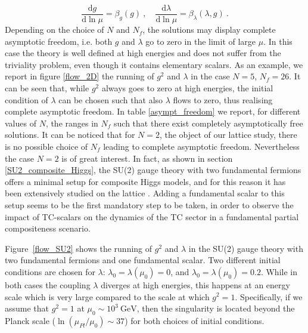 \begin{equation}
\frac{\mathrm d g}{\mathrm d \ln \mu} = \beta_g (g) \: ,  \quad \frac{\mathrm d \lambda}{\mathrm d \ln \mu} = \beta_{\lambda} (\lambda,g) \: .
\end{equation}
%
Depending on the choice of $N$ and $N_f$, the solutions may display complete asymptotic freedom, i.e. both $g$ and $\lambda$ go to zero in the limit of large $\mu$. In this case the theory is well defined at high energies and does not suffer from the triviality problem, even though it contains elementary scalars.  As an example, we report in figure \ref{flow_2D} the running of $g^2$ and $\lambda$ in the case $N=5$, $N_f=26$. It can be seen that, while $g^2$ always goes to zero at high energies, the initial condition of $\lambda$ can be chosen such that also $\lambda$ flows to zero, thus realising complete asymptotic freedom. In table \ref{asympt_freedom} we report, for different values of $N$, the ranges in $N_f$ such that there exist completely asymptotically free solutions. It can be noticed that for $N=2$, the object of our lattice study, there is no possible choice of $N_f$ leading to complete asymptotic freedom. Nevertheless the case $N=2$ is of great interest. In fact, as shown in section \ref{SU2_composite_Higgs}, the SU(2) gauge theory with two fundamental fermions offers a minimal setup for composite Higgs models, and for this reason it has been extensively studied on the lattice \cite{Arthur:2016dir}. Adding a fundamental scalar to this setup seems to be the first mandatory step to be taken, in order to observe the impact of TC-scalars on the dynamics of the TC sector in a fundamental partial compositeness scenario.

Figure~\ref{flow_SU2} shows the running of $g^2$ and $\lambda$ in the SU(2) gauge theory with two fundamental fermions and one fundamental scalar. 
Two different initial conditions are chosen for $\lambda$: $\lambda_0 = \lambda(\mu_0) = 0$, and $\lambda_0=\lambda(\mu_0)=0.2$. 
While in both cases the coupling $\lambda$ diverges at high energies, this happens at an energy scale which is very large compared to the scale at which $g^2=1$. Specifically, if we assume that $g^2=1$ at $\mu_0 \sim 10^3 \: \mathrm{GeV}$, then the singularity is located beyond the Planck scale ($\ln(\mu_{Pl} / \mu_0) \sim 37$) for both choices of initial conditions. 



